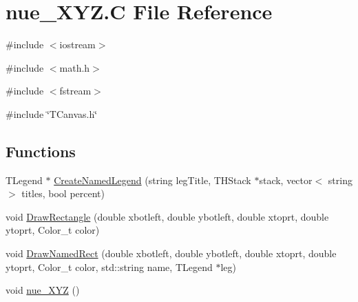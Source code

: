 \hypertarget{nue__XYZ_8C}{
\section{nue\_\-XYZ.C File Reference}
\label{nue__XYZ_8C}
}
{\ttfamily \#include $<$iostream$>$}\par
{\ttfamily \#include $<$math.h$>$}\par
{\ttfamily \#include $<$fstream$>$}\par
{\ttfamily \#include \char`\"{}TCanvas.h\char`\"{}}\par
\subsection*{Functions}
\begin{DoxyCompactItemize}
\item 
TLegend $\ast$ \hyperlink{nue__XYZ_8C_a8188ddbc4f225306acb50c18a178dfb4}{CreateNamedLegend} (string legTitle, THStack $\ast$stack, vector$<$ string $>$ titles, bool percent)
\item 
void \hyperlink{nue__XYZ_8C_af5f4134ee179dee101f540be506e38d6}{DrawRectangle} (double xbotleft, double ybotleft, double xtoprt, double ytoprt, Color\_\-t color)
\item 
void \hyperlink{nue__XYZ_8C_aa836ed978fdaec6efd39bfa1bfe9fd01}{DrawNamedRect} (double xbotleft, double ybotleft, double xtoprt, double ytoprt, Color\_\-t color, std::string name, TLegend $\ast$leg)
\item 
void \hyperlink{nue__XYZ_8C_a2b0fd74e557219bb591fda3c3a21babb}{nue\_\-XYZ} ()
\end{DoxyCompactItemize}


